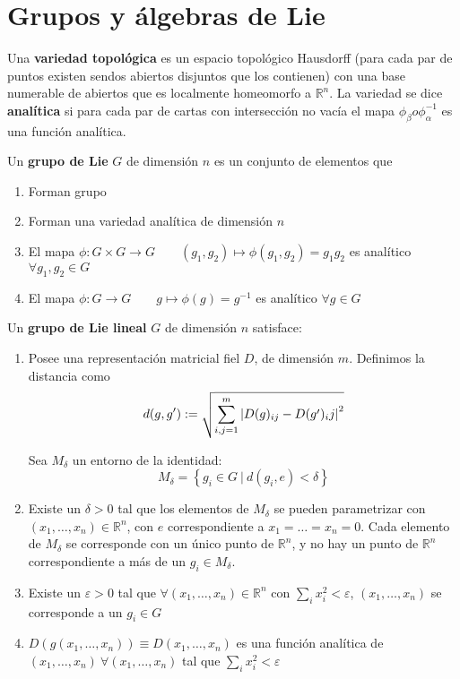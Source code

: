 \section{Grupos y álgebras de Lie}
\begin{definicion}
Una \textbf{variedad topológica} es un espacio topológico Hausdorff (para cada par de puntos existen sendos abiertos disjuntos que los contienen) con una base numerable de abiertos que es localmente homeomorfo a $\mathbb{R}^n$.  La variedad se dice \textbf{analítica} si para cada par de cartas con intersección no vacía el mapa $\phi_\beta o \phi_\alpha^{-1}$ es una función analítica.
\end{definicion}

\begin{definicion}
Un \textbf{grupo de Lie} $G$ de dimensión $n$ es un conjunto de elementos que
\begin{enumerate}[label=\roman*)]
\item Forman grupo
\item Forman una variedad analítica de dimensión $n$
\item El mapa $\phi:G\times G\rightarrow G\qquad (g_1,g_2)\mapsto \phi(g_1,g_2)=g_1g_2$ es analítico $\forall g_1,g_2\in G$
\item El mapa $\phi:G\rightarrow G\qquad g\mapsto \phi(g)=g^{-1}$ es analítico $\forall g\in G$
\end{enumerate}
\end{definicion}

\begin{definicion}
Un \textbf{grupo de Lie lineal} $G$ de dimensión $n$ satisface:
\begin{enumerate}[label=\roman*)]
\item Posee una representación matricial fiel $D$, de dimensión $m$. Definimos la distancia como
\begin{equation}
d(g,g'):=\sqrt{\sum_{i,j=1}^m\left\lvert D(g)_{ij}-D(g')_ij\right\rvert^2}
\end{equation}

Sea $M_\delta$ un entorno de la identidad:
\begin{equation}
M_\delta=\left\{g_i\in G\ |\ d(g_i,e)<\delta\right\}
\end{equation}
\item Existe un $\delta>0$ tal que los elementos de $M_\delta$ se pueden parametrizar con  $(x_1,\ldots,x_n)\in \mathbb{R}^n$, con $e$ correspondiente a $x_1=\ldots=x_n=0$. Cada elemento de $M_\delta$ se corresponde con un único punto de $\mathbb{R}^n$, y no hay un punto de $\mathbb{R}^n$ correspondiente a más de un $g_i \in M_\delta$.
\item Existe un $\varepsilon>0$ tal que $\forall (x_1,\ldots,x_n)\in \mathbb{R}^n$ con $\sum_i x_i^2<\varepsilon$, $(x_1,\ldots,x_n)$ se corresponde a un $g_i\in G$
\item $D(g(x_1,\ldots,x_n))\equiv D(x_1,\ldots,x_n)$ es una función analítica de $(x_1,\ldots,x_n)\ \forall (x_1,\ldots,x_n)$  tal que $\sum_i x_i^2<\varepsilon$
\end{enumerate}
\end{definicion}

